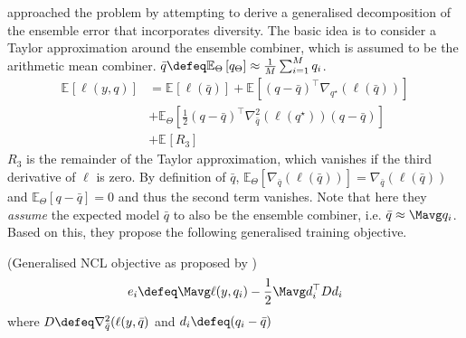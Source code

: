 \documentclass[../main.tex]{subfiles}
\begin{document}
\cite{buschjager_GeneralizedNegativeCorrelation_2020} approached the problem by attempting to derive a generalised decomposition of the ensemble error that incorporates diversity. The basic idea is to consider a Taylor approximation around the ensemble combiner, which is assumed to be the arithmetic mean combiner. $\bar{q} \defeq \mathbb{E}_{\Theta}\left[ q_{\Theta} \right] \approx \frac{1}{M}\sum_{i=1}^M q_i$.
\begin{align*}
\mathbb{E}_{}\left[ \ell(y, q) \right]  &= 
\mathbb{E}_{}\left[ \ell(\bar{q}) \right] 
+ \mathbb{E}_{}\left[ (q - \bar{q})^\top \nabla_{q^\star}(\ell (\bar{q})) \right]  \\
&+ \mathbb{E}_{\Theta}\left[ \frac{1}{2} (q-\bar{q})^\top\nabla^2_{\bar{q}}(\ell(q^\star))(q-\bar{q}) \right] \\
&+ \mathbb{E}_{}\left[ R_{3} \right] 
\end{align*}
$R_{3}$ is the remainder of the Taylor approximation, which vanishes if the third derivative of $\ell$ is zero.
By definition of $\bar{q}$, $\mathbb{E}_{\Theta}\left[ \nabla_{\bar{q}}(\ell(\bar{q})) \right] = \nabla_{\bar{q}}(\ell(\bar{q}))$ and $\mathbb{E}_{\Theta}\left[ q-\bar{q} \right] = 0$ and thus the second term vanishes.
Note that here they \textit{assume} the expected model $\bar{q}$ to also be the ensemble combiner, i.e. $\bar{q} \approx \Mavg q_{i}$. 
Based on this, they propose the following generalised training objective.
\begin{definition} (Generalised NCL objective as proposed by \cite{buschjager_GeneralizedNegativeCorrelation_2020})
    \label{def:buschj-ncl-objective}
$$
e_i \defeq \Mavg \ell(y,q_{i}) - \frac{1}{2} \Mavg d_{i}^\top D d_{i}
$$
where $D \defeq \nabla^2_{\bar{q}}(\ell(y, \bar{q})$ and $d_{i} \defeq (q_{i} - \bar{q})$
\end{definition}
\end{document}
